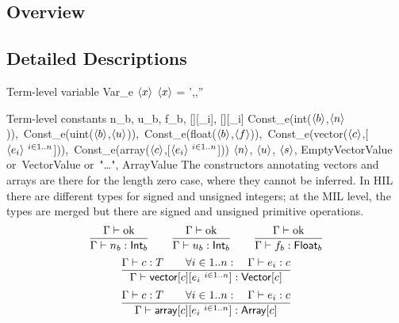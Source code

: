 \documentclass[12pt,twoside,fleqn]{article}
\begin{document}
\subsection{Overview}

\subsection{Detailed Descriptions}

  {Term-level variable}
  {\evar}
  {Var\_e $\langle{x}\rangle$}
  {$\langle{x}\rangle$}
  {}
  {\irule
    {\validcontext{\context}\qquad
     \context = \context',\evar{:}\ctype,\context''}
    {\validexpression{\context}{\evar}{\ctype}}}

  {Term-level constants}
  {n_b, u_b, f_b,
   [\constructor][\expression_i],
   [\constructor][\expression_i]}
  {Const\_e(int($\langle{b}\rangle$,$\langle{n}\rangle$)),\
   Const\_e(uint($\langle{b}\rangle$,$\langle{u}\rangle$)),\
   Const\_e(float($\langle{b}\rangle$,$\langle{f}\rangle$)),\
   Const\_e(vector($\langle{c}\rangle$,[$\langle{e_i}\rangle\ {}^{i\in 1..n}$])),\ 
   Const\_e(array($\langle{c}\rangle$,[$\langle{e_i}\rangle\ {}^{i\in 1..n}$]))}
  {$\langle{n}\rangle$, $\langle{u}\rangle$, $\langle{s}\rangle$, EmptyVectorValue 
   \mbox{or}\ VectorValue \mbox{or}\ "\ldots", ArrayValue}
  {The constructors annotating vectors and arrays are there for the
   length zero case, where they cannot be inferred.  In HIL there are
   different types for signed and unsigned integers; at the MIL level,
   the types are merged but there are signed and unsigned primitive
   operations.  }
  {\[
   \frac{{\Gamma}\vdash\mbox{ok}}
        {\Gamma\vdash n_b : \mathsf{Int}_b}
   \qquad
   \frac{{\Gamma}\vdash\mbox{ok}}
        {\Gamma\vdash u_b : \mathsf{Int}_b}
   \qquad
   \frac{{\Gamma}\vdash\mbox{ok}}
        {\Gamma\vdash f_b : \mathsf{Float}_b}
   \]
   \[
   \frac{\Gamma\vdash c : T\qquad
         \forall i\in1..n:\quad
             \Gamma\vdash e_i : c}
        {\Gamma\vdash \mathsf{vector}[c][e_i\ {}^{i\in 1..n}] : \mathsf{Vector}[c]}
   \]
   \[
   \frac{\Gamma\vdash c : T\qquad
         \forall i\in1..n:\quad
             \Gamma\vdash e_i : c}
        {\Gamma\vdash \mathsf{array}[c][e_i\ {}^{i\in 1..n}] : \mathsf{Array}[c]}
   \]
  }
\end{document}
